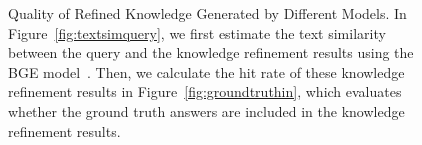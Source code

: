 
\begin{figure}[t]
    \centering
    \caption{Quality of Refined Knowledge Generated by Different Models. In Figure~\ref{fig:textsimquery}, we first estimate the text similarity between the query and the knowledge refinement results using the BGE model~\cite{chen2024bge}. Then, we calculate the hit rate of these knowledge refinement results in Figure~\ref{fig:groundtruthin}, which evaluates whether the ground truth answers are included in the knowledge refinement results.}
    \label{fig:refined knowledge quality}
\end{figure}